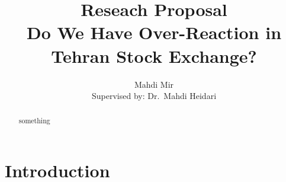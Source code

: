 \documentclass[12pt]{article}
\title{Reseach Proposal\\Do We Have Over-Reaction in\\Tehran Stock Exchange?}
\author{Mahdi Mir\\Supervised by: Dr.\ Mahdi Heidari}
\begin{document}
\maketitle

\begin{abstract}
    something
\end{abstract}

\section{Introduction}
\end{document}
